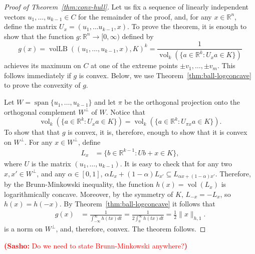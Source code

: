\documentclass[11pt]{article}
\newcommand{\R}{{\mathbb{R}}}
\newcommand{\T}{\mathsf T}
\DeclareMathOperator{\vollb}{volLB}
\DeclareMathOperator{\vol}{vol}
\DeclareMathOperator{\lspan}{span}
\newcommand{\notename}[2]{{\textcolor{red}{{\bf (#1:} {#2}{\bf ) }}}}
\newcommand{\notename}[2]{{\textcolor{red}{\footnotesize{\bf (#1:} {#2}{\bf ) }}}}
\newcommand{\snote}[1]{{\notename{Sasho}{#1}}}
\newcommand{\notename}[2]{{}}
\newcommand{\snote}[1]{}
\begin{document}
\begin{proof}[Proof of Theorem~\ref{thm:conv-hull}]
  Let us fix a sequence of linearly independent vectors $u_1,
  \ldots, u_{k-1} \in C$ for the remainder of the proof,
  and, for any $x\in \R^n$, define the matrix $U_x = (u_1, \ldots
  u_{k-1}, x)$.  To prove the theorem, it is enough to show that the
  function $g: \R^n \to [0, \infty)$ defined by
  \[
  g(x) = \vollb((u_1, \ldots, u_{k-1}, x), K)^k 
  = \frac{1}{\vol_k(\{a \in \R^k: U_x a \in K\})}
  \]
  achieves its maximum on $C$ at one of the extreme points $\pm v_1,
  \ldots, \pm v_m$. This follows immediately if $g$ is
  convex. Below, we use Theorem~\ref{thm:ball-logconcave} to prove the
  convexity of $g$.
  
  Let  $W = \lspan\{u_1, \ldots, u_{k-1}\}$ and let $\pi$ be
  the orthogonal projection onto the orthogonal complement $W^\perp$
  of $W$. Notice that 
  \[
  \vol_k(\{a \in \R^k: U_x a \in K\}) 
  = \vol_k(\{a \in \R^k: U_{\pi x} a \in K\}).
  \]
  To show that that $g$ is convex, it is, therefore, enough to show
  that it is convex on $W^\perp$.  For any $x \in W^\perp$, define 
  \begin{align*}
    L_x &= \{b \in \R^{k-1}: Ub + x \in K\},
  \end{align*}
  where $U$ is the matrix $(u_1, \ldots, u_{k-1})$. It is
  easy to check that for any two $x, x' \in W^\perp$, and any $\alpha
  \in [0,1]$, $\alpha L_{x} + (1-\alpha) L_{x'} \subseteq L_{\alpha x
    + (1-\alpha)x'}$. Therefore, by the Brunn-Minkowski inequality,
  the function $h(x) = \vol(L_x)$ is logarithmically
  concave. Moreover, by the symmetry of $K$, $L_{-x} = -L_x$, so $h(x)
  = h(-x)$.  By Theorem~\ref{thm:ball-logconcave} it follows that 
  \begin{align*}
  g(x) &=\frac{1}{\int_{-\infty}^\infty h(tx) dt}
  = \frac{1}{2\int_{0}^\infty h(tx) dt}
  = \frac{1}{2}\|x\|_{h,1}.
  \end{align*}
  is a norm on $W^\perp$, and, therefore, convex. The theorem follows.
\end{proof}

\snote{Do we need to state Brunn-Minkowski anywhere?}
\end{document}

